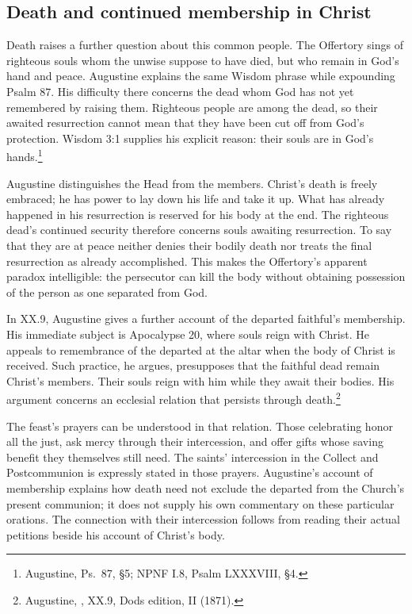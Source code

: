 \subsection{Death and continued membership in Christ}
Death raises a further question about this common people. The Offertory
sings of righteous souls whom the unwise suppose to have died, but who
remain in God's hand and peace. Augustine explains the same Wisdom phrase
while expounding Psalm 87. His difficulty there concerns the dead whom God
has not yet remembered by raising them. Righteous people are among the dead,
so their awaited resurrection cannot mean that they have been cut off from
God's protection. Wisdom 3:1 supplies his explicit reason: their souls are
in God's hands.\footnote{Augustine, Ps.~87, \S5; NPNF I.8,
Psalm LXXXVIII, \S4.}

Augustine distinguishes the Head from the members. Christ's death is freely
embraced; he has power to lay down his life and take it up. What has already
happened in his resurrection is reserved for his body at the end.
The righteous dead's continued security therefore concerns souls awaiting
resurrection. To say that they are at peace neither denies their bodily
death nor treats the final resurrection as already accomplished.
This makes the Offertory's apparent paradox intelligible: the persecutor can
kill the body without obtaining possession of the person as one separated
from God.

In  XX.9, Augustine gives a further account of the
departed faithful's membership. His immediate subject is Apocalypse 20,
where souls reign with Christ. He appeals to remembrance of the departed at
the altar when the body of Christ is received. Such practice, he argues,
presupposes that the faithful dead remain Christ's members. Their souls
reign with him while they await their bodies. His argument concerns an
ecclesial relation that persists through death.\footnote{Augustine,
, XX.9, Dods edition, II (1871).}

The feast's prayers can be understood in that relation. Those celebrating
honor all the just, ask mercy through their intercession, and offer gifts
whose saving benefit they themselves still need. The saints' intercession
in the Collect and Postcommunion is expressly stated in those prayers.
Augustine's account of membership explains how death need not exclude the
departed from the Church's present communion; it does not supply his own
commentary on these particular orations. The connection with their
intercession follows from reading their actual petitions beside his
account of Christ's body.

